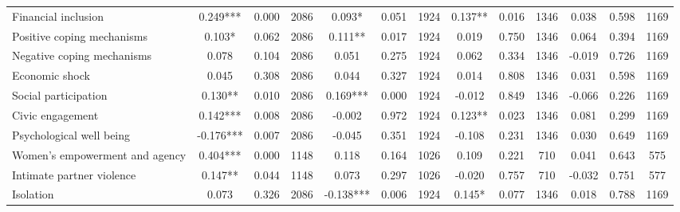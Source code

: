 \begin{tabular}{l*{12}{c}}
 Financial inclusion &        0.249*** &        0.000 & 2086    &        0.093* &        0.051 & 1924    &        0.137** &        0.016 & 1346 &        0.038 &        0.598 & 1169 \\ 

 Positive coping mechanisms &        0.103* &        0.062 & 2086    &        0.111** &        0.017 & 1924    &        0.019 &        0.750 & 1346 &        0.064 &        0.394 & 1169 \\ 

 Negative coping mechanisms &        0.078 &        0.104 & 2086    &        0.051 &        0.275 & 1924    &        0.062 &        0.334 & 1346 &       -0.019 &        0.726 & 1169 \\ 

 Economic shock &        0.045 &        0.308 & 2086    &        0.044 &        0.327 & 1924    &        0.014 &        0.808 & 1346 &        0.031 &        0.598 & 1169 \\ 

 Social participation &        0.130** &        0.010 & 2086    &        0.169*** &        0.000 & 1924    &       -0.012 &        0.849 & 1346 &       -0.066 &        0.226 & 1169 \\ 

 Civic engagement &        0.142*** &        0.008 & 2086    &       -0.002 &        0.972 & 1924    &        0.123** &        0.023 & 1346 &        0.081 &        0.299 & 1169 \\ 

 Psychological well being &       -0.176*** &        0.007 & 2086    &       -0.045 &        0.351 & 1924    &       -0.108 &        0.231 & 1346 &        0.030 &        0.649 & 1169 \\ 

 Women's empowerment and agency &        0.404*** &        0.000 & 1148    &        0.118 &        0.164 & 1026    &        0.109 &        0.221 & 710 &        0.041 &        0.643 & 575 \\ 

 Intimate partner violence &        0.147** &        0.044 & 1148    &        0.073 &        0.297 & 1026    &       -0.020 &        0.757 & 710 &       -0.032 &        0.751 & 577 \\ 

 Isolation &        0.073 &        0.326 & 2086    &       -0.138*** &        0.006 & 1924    &        0.145* &        0.077 & 1346 &        0.018 &        0.788 & 1169 \\ 


\end{tabular}
